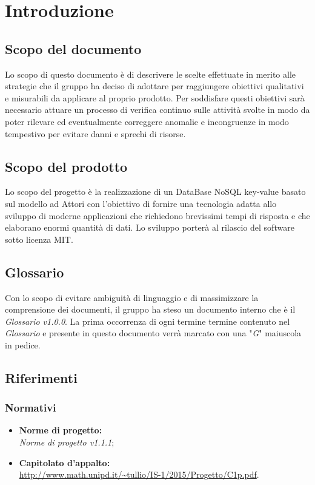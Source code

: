 \documentclass[a4paper]{report}
\newcommand{\mychapter}[2]{
	\setcounter{chapter}{#1}
	\setcounter{section}{0}
	\setcounter{subsection}{1}
	\chapter*{#2}
	\addcontentsline{toc}{chapter}{#2}
}
\begin{document}
	\mychapter{1}{Introduzione}
		\section{Scopo del documento}
			Lo scopo di questo documento è di descrivere le scelte effettuate in merito alle strategie 
			che il gruppo ha deciso di adottare per raggiungere obiettivi qualitativi e misurabili da 
			applicare al proprio prodotto. Per soddisfare questi obiettivi sarà necessario attuare un 
			processo di verifica continuo sulle attività svolte in modo da poter rilevare ed eventualmente 
			correggere anomalie e incongruenze in modo tempestivo per evitare danni e sprechi di risorse.
		\section{Scopo del prodotto}
			Lo scopo del progetto è la realizzazione di un DataBase NoSQL key-value basato sul modello ad 
			Attori con l'obiettivo di fornire una tecnologia adatta allo sviluppo di moderne 
			applicazioni che richiedono brevissimi tempi di risposta e che elaborano enormi quantità 
			di dati. Lo sviluppo porterà al rilascio del software sotto licenza MIT.
		\section{Glossario}
			Con lo scopo di evitare ambiguità di linguaggio e di massimizzare la comprensione dei documenti, il 
			gruppo ha steso un documento interno che è il \emph{Glossario v1.0.0}. La prima occorrenza
			di ogni termine termine contenuto nel \emph{Glossario} e presente in questo documento verrà 
			marcato con una "\textit{G}" maiuscola in pedice.
		\section{Riferimenti}
			\subsection{Normativi}
				\begin{itemize}
					\item \textbf{Norme di progetto:} \\ \emph{Norme di progetto v1.1.1};
					\item \textbf{Capitolato d'appalto:} \\ \url{http://www.math.unipd.it/~tullio/IS-1/2015/Progetto/C1p.pdf}.
				\end{itemize}
\end{document}

